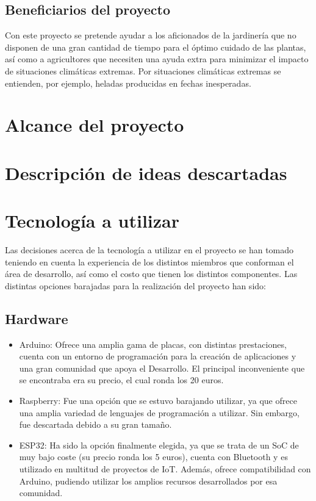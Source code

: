 \documentclass[runningheads]{llncs}
\begin{document}
    \subsection{Beneficiarios del proyecto}
    Con este proyecto se pretende ayudar a los aficionados de la jardinería que no disponen de una gran cantidad de tiempo para el óptimo cuidado de las plantas, así como a agricultores que necesiten una ayuda extra para minimizar el impacto de situaciones climáticas extremas. Por situaciones climáticas extremas se entienden, por ejemplo, heladas producidas en fechas inesperadas.
    
\section{Alcance del proyecto}

\section{Descripción de ideas descartadas}

\section{Tecnología a utilizar}
Las decisiones acerca de la tecnología a utilizar en el proyecto se han tomado teniendo en cuenta la experiencia de los distintos miembros que conforman el área de desarrollo, así como el costo que tienen los distintos componentes.
\newline
Las distintas opciones barajadas para la realización del proyecto han sido:

\subsection*{Hardware}

\begin{itemize}
    \item Arduino: Ofrece una amplia gama de placas, con distintas prestaciones, cuenta con un entorno de programación para la creación de aplicaciones y una gran comunidad que apoya el Desarrollo. El principal inconveniente que se encontraba era su precio, el cual ronda los 20 euros.
    
    \item Raspberry: Fue una opción que se estuvo barajando utilizar, ya que ofrece una amplia variedad de lenguajes de programación a utilizar. Sin embargo, fue descartada debido a su gran tamaño.
    
    \item ESP32: Ha sido la opción finalmente elegida, ya que se trata de un SoC de muy bajo coste (su precio ronda los 5 euros), cuenta con Bluetooth y es utilizado en multitud de proyectos de IoT. Además, ofrece compatibilidad con Arduino, pudiendo utilizar los amplios recursos desarrollados por esa comunidad.
\end{itemize}
\end{document}
